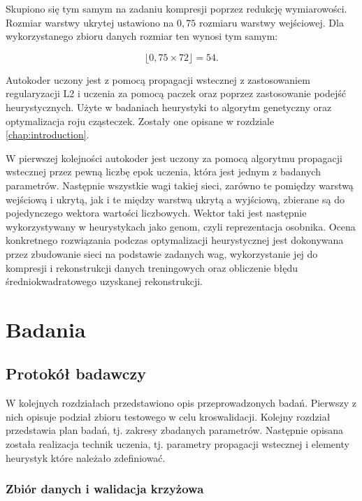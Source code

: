 \documentclass[11pt,a4paper,oneside]{report}
\begin{document}
Skupiono się tym samym na zadaniu kompresji poprzez redukcję wymiarowości. Rozmiar warstwy ukrytej ustawiono na $0,75$ rozmiaru warstwy wejściowej. Dla wykorzystanego zbioru danych rozmiar ten wynosi tym samym:

\begin{equation}
\lfloor 0,75 \times 72 \rfloor = 54 .
\end{equation}

Autokoder uczony jest z pomocą propagacji wstecznej z zastosowaniem regularyzacji L2 i uczenia za pomocą paczek oraz poprzez zastosowanie podejść heurystycznych. Użyte w badaniach heurystyki to algorytm genetyczny oraz optymalizacja roju cząsteczek. Zostały one opisane w rozdziale \ref{chap:introduction}. 

W pierwszej kolejności autokoder jest uczony za pomocą algorytmu propagacji wstecznej przez pewną liczbę epok uczenia, która jest jednym z badanych parametrów. Następnie wszystkie wagi takiej sieci, zarówno te pomiędzy warstwą wejściową i ukrytą, jak i te między warstwą ukrytą a wyjściową, zbierane są do pojedynczego wektora wartości liczbowych. Wektor taki jest następnie wykorzystywany w heurystykach jako genom, czyli reprezentacja osobnika. Ocena konkretnego rozwiązania podczas optymalizacji heurystycznej jest dokonywana przez zbudowanie sieci na podstawie zadanych wag, wykorzystanie jej do kompresji i rekonstrukcji danych treningowych oraz obliczenie błędu średniokwadratowego uzyskanej rekonstrukcji. 

\chapter{Badania}

\section{Protokół badawczy}

W kolejnych rozdziałach przedstawiono opis przeprowadzonych badań. Pierwszy z nich opisuje podział zbioru testowego w celu kroswalidacji. Kolejny rozdział przedstawia plan badań, tj. zakresy zbadanych parametrów. Następnie opisana została realizacja technik uczenia, tj. parametry propagacji wstecznej i elementy heurystyk które należało zdefiniować.

\subsection{Zbiór danych i walidacja krzyżowa}
\end{document}

